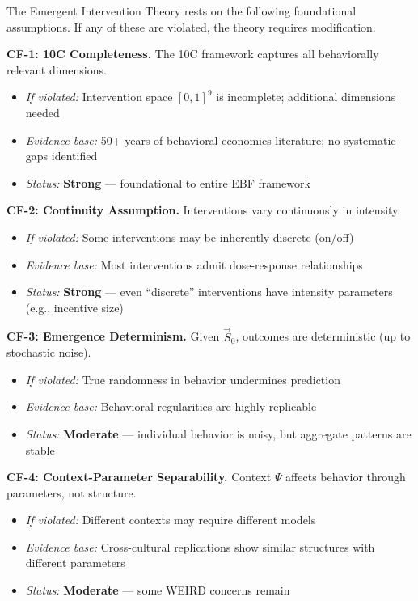 \begin{tcolorbox}[colback=red!5!white, colframe=red!75!black,
    title=\textbf{Critical Foundations: What EIT Depends On}]

The Emergent Intervention Theory rests on the following foundational assumptions. If any of these are violated, the theory requires modification.

\textbf{CF-1: 10C Completeness.} The 10C framework captures all behaviorally relevant dimensions.
\begin{itemize}[nosep]
    \item \textit{If violated:} Intervention space $[0,1]^9$ is incomplete; additional dimensions needed
    \item \textit{Evidence base:} 50+ years of behavioral economics literature; no systematic gaps identified
    \item \textit{Status:} \textbf{Strong} --- foundational to entire EBF framework
\end{itemize}

\textbf{CF-2: Continuity Assumption.} Interventions vary continuously in intensity.
\begin{itemize}[nosep]
    \item \textit{If violated:} Some interventions may be inherently discrete (on/off)
    \item \textit{Evidence base:} Most interventions admit dose-response relationships
    \item \textit{Status:} \textbf{Strong} --- even ``discrete'' interventions have intensity parameters (e.g., incentive size)
\end{itemize}

\textbf{CF-3: Emergence Determinism.} Given $\vec{S}_0$, outcomes are deterministic (up to stochastic noise).
\begin{itemize}[nosep]
    \item \textit{If violated:} True randomness in behavior undermines prediction
    \item \textit{Evidence base:} Behavioral regularities are highly replicable \citep{camerer2016evaluating}
    \item \textit{Status:} \textbf{Moderate} --- individual behavior is noisy, but aggregate patterns are stable
\end{itemize}

\textbf{CF-4: Context-Parameter Separability.} Context $\Psi$ affects behavior through parameters, not structure.
\begin{itemize}[nosep]
    \item \textit{If violated:} Different contexts may require different models
    \item \textit{Evidence base:} Cross-cultural replications show similar structures with different parameters
    \item \textit{Status:} \textbf{Moderate} --- some WEIRD concerns remain \citep{henrich2010weirdest}
\end{itemize}


\end{tcolorbox}
